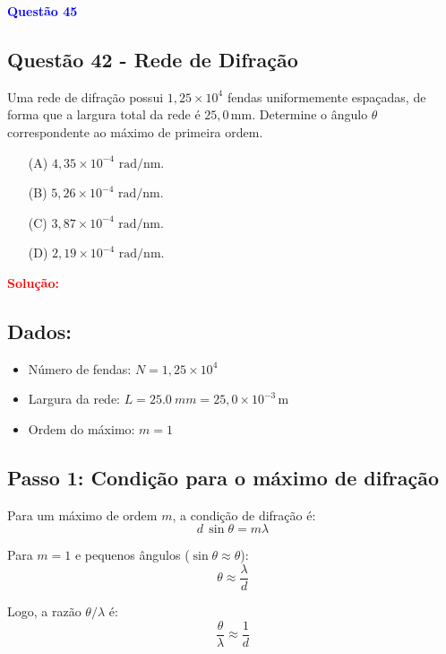\begin{flushleft}
\textbf{\textcolor{blue}{\Large Quest\~ao 45 }}\\
\noindent
\subsection{Quest\~ao 42 - Rede de Difração}
Uma rede de difração possui \( 1{,}25 \times 10^{4} \) fendas uniformemente espaçadas, de forma que a largura total da rede é \( 25,0\,\mathrm{mm} \).  
Determine o ângulo \( \theta \) correspondente ao máximo de primeira ordem.

\begin{itemize}
\item[(A)] $4{,}35 \times 10^{-4} \textrm{ rad/nm}$.
\item[(B)] $5{,}26 \times 10^{-4} \textrm{ rad/nm}$.
\item[(C)] $3{,}87 \times 10^{-4} \textrm{ rad/nm}$.
\item[(D)] $2{,}19 \times 10^{-4} \textrm{ rad/nm}$.
\end{itemize}

\vspace{0.5cm}

\textcolor{red}{\textbf{Solução:}}\\

\subsection*{Dados:}
\begin{itemize}
    \item Número de fendas: \( N = 1{,}25 \times 10^4 \)
    \item Largura da rede: \( L = \SI{25,0}{mm} = 25,0 \times 10^{-3}\,\mathrm{m} \)
    \item Ordem do máximo: \( m = 1 \)
\end{itemize}

\subsection*{Passo 1: Condição para o máximo de difração}

Para um máximo de ordem \(m\), a condição de difração é:
\[
d \, \sin\theta = m\lambda
\]

Para \(m=1\) e pequenos ângulos (\( \sin\theta \approx \theta \)):
\[
\theta \approx \frac{\lambda}{d}
\]

Logo, a razão \( \theta/\lambda \) é:
\[
\frac{\theta}{\lambda} \approx \frac{1}{d}
\]


\end{flushleft}
